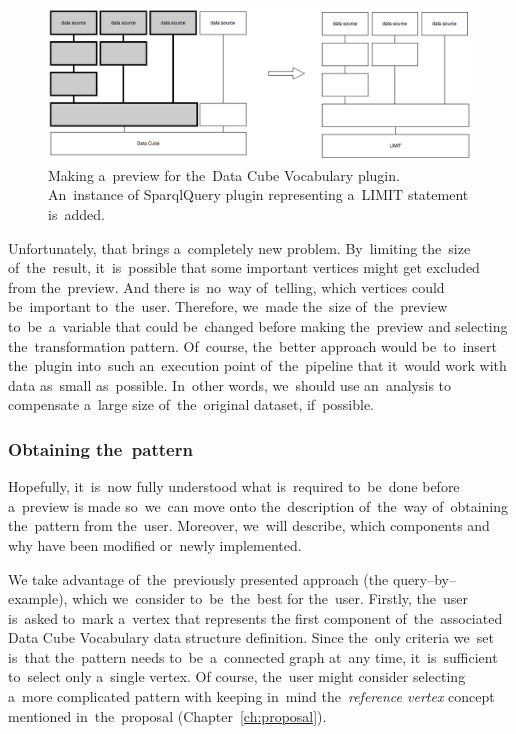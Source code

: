 \begin{figure}
	\centering
	\includegraphics[width=140mm]{img/dcv-extraction-limit.png}
	\caption{Making a~preview for the~Data Cube Vocabulary plugin. An~instance of
	SparqlQuery plugin representing a~LIMIT statement is~added.}
	\label{fig:dcv-extraction-limit}
\end{figure}

Unfortunately, that brings a~completely new problem. By~limiting the~size of~the~result, it~is~possible that some important vertices might get excluded from the~preview.
And there is~no~way of~telling, which vertices could be~important to~the~user. Therefore, we~made the~size of~the~preview to~be~a~variable that could be~changed before making the~preview and 
selecting the~transformation pattern. Of~course, the~better approach would be~to~insert the~plugin into~such an~execution point of~the~pipeline that it~would 
work with data as~small as~possible. In~other words, we~should use an~analysis 
to compensate a~large size of~the~original dataset, if~possible.



\subsubsection{Obtaining the~pattern}
Hopefully, it~is~now fully understood what is~required to~be~done before a~preview 
is made so~we~can move onto the~description of~the~way of~obtaining the~pattern 
from the~user. Moreover, we~will describe, which components and why have been 
modified or~newly implemented.

\begin{sloppypar}
We take advantage of~the~previously presented approach (the query--by--example), which we~consider to~be~the~best for the~user. Firstly, the~user is~asked to~mark a~vertex that represents
the first component of~the~associated Data Cube Vocabulary data structure 
definition. Since the~only criteria we~set is~that the~pattern needs to~be~a~connected graph at~any time, it~is~sufficient to~select only a~single vertex.
Of course, the~user might consider selecting a~more complicated pattern with keeping in~mind the~\emph{reference vertex} concept mentioned in~the~proposal (Chapter~\ref{ch:proposal}).
\end{sloppypar}

